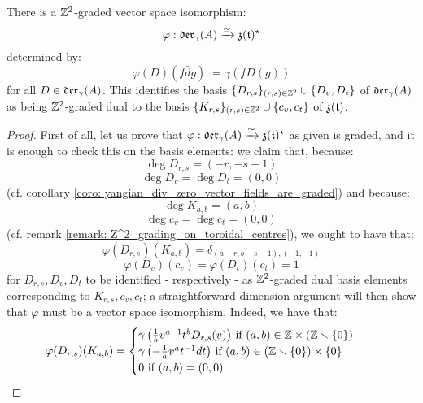         \begin{proposition} \label{prop: yangian_div_zero_vector_fields_are_graded_dual_to_toroidal_centre}
            There is a $\Z^2$-graded vector space isomorphism:
                $$\varphi: \divzero \xrightarrow[]{\cong} \z(\toroidal)^{\star}$$
            determined by:
                $$\varphi(D)( f\bar{d}g ) := \gamma( f D(g) )$$
            for all $D \in \divzero$. This identifies the basis $\{D_{r, s}\}_{(r, s) \in \Z^2} \cup \{D_v, D_t\}$ of $\divzero$ as being $\Z^2$-graded dual to the basis $\{K_{r, s}\}_{(r, s) \in \Z^2} \cup \{c_v, c_t\}$ of $\z(\toroidal)$.
        \end{proposition}
            \begin{proof}
                First of all, let us prove that $\varphi: \divzero \xrightarrow[]{\cong} \z(\toroidal)^{\star}$ as given is graded, and it is enough to check this on the basis elements: we claim that, because:
                    $$\deg D_{r, s} = (-r, -s - 1)$$
                    $$\deg D_v = \deg D_t = (0, 0)$$
                (cf. corollary \ref{coro: yangian_div_zero_vector_fields_are_graded}) and because:
                    $$\deg K_{a, b} = (a, b)$$
                    $$\deg c_v = \deg c_t = (0, 0)$$
                (cf. remark \ref{remark: Z^2_grading_on_toroidal_centres}), we ought to have that:
                    $$\varphi(D_{r, s})(K_{a, b}) = \delta_{(a - r, b - s - 1), (-1, -1)}$$
                    $$\varphi(D_v)(c_v) = \varphi(D_t)(c_t) = 1$$
                for $D_{r, s}, D_v, D_t$ to be identified - respectively - as $\Z^2$-graded dual basis elements corresponding to $K_{r, s}, c_v, c_t$; a straightforward dimension argument will then show that $\varphi$ must be a vector space isomorphism. Indeed, we have that:
                    $$
                        \begin{aligned}
                            \varphi(D_{r, s})(K_{a, b}) & = 
                            \begin{cases}
                                \text{$\gamma\left( \frac1b v^{a - 1} t^b D_{r, s}(v) \right)$ if $(a, b) \in \Z \x (\Z \setminus \{0\})$}
                                \\
                                \text{$\gamma\left( -\frac1a v^a t^{-1} \bar{d}t \right)$ if $(a, b) \in (\Z \setminus \{0\}) \x \{0\}$}
                                \\
                                \text{$0$ if $(a, b) = (0, 0)$}

\end{cases}
\end{aligned}$$
\end{proof}
